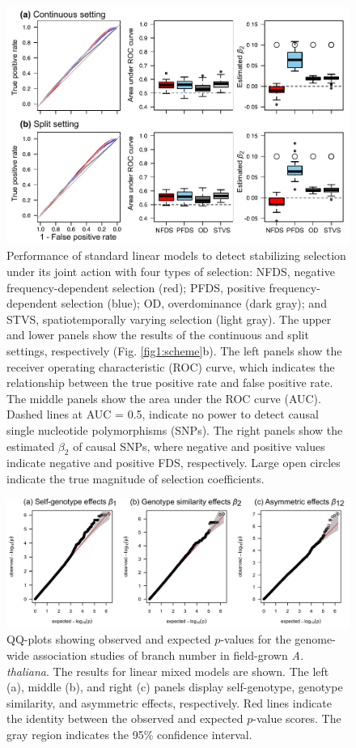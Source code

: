 \documentclass[12pt,]{article}
\begin{document}
\begin{figure}[]
  \includegraphics[width=\linewidth]{beta1LMdomi.pdf}
  \caption{Performance of standard linear models to detect stabilizing selection under its joint action with four types of selection:  NFDS, negative frequency-dependent selection (red); PFDS, positive frequency-dependent selection (blue); OD, overdominance (dark gray); and STVS, spatiotemporally varying selection (light gray). The upper and lower panels show the results of the continuous and split settings, respectively (Fig. \ref{fig1:scheme}b). The left panels show the receiver operating characteristic (ROC) curve, which indicates the relationship between the true positive rate and false positive rate. The middle panels show the area under the ROC curve (AUC). Dashed lines at AUC = 0.5, indicate no power to detect causal single nucleotide polymorphisms (SNPs). The right panels show the estimated $\beta_2$ of causal SNPs, where negative and positive values indicate negative and positive FDS, respectively. Large open circles indicate the true magnitude of selection coefficients.}
  \label{figS7:beta1LM}
\end{figure}


\begin{figure}[]
  \includegraphics[width=\linewidth]{QQplotLMM.png}
  \caption{QQ-plots showing observed and expected $p$-values for the genome-wide association studies of branch number in field-grown \textit{A. thaliana}. The results for linear mixed models are shown. The left (a), middle (b), and right (c) panels display self-genotype, genotype similarity, and asymmetric effects, respectively. Red lines indicate the identity between the observed and expected $p$-value scores. The gray region indicates the 95\% confidence interval.}
  \label{figS9:QQplotLMM}
\end{figure}
\end{document}
